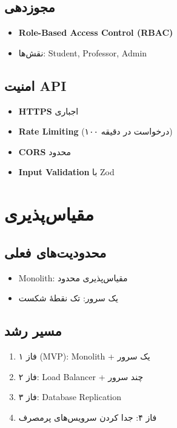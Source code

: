 \documentclass[12pt, a4paper]{article}
\begin{document}
\subsection{مجوزدهی}
\begin{itemize}
    \item \textbf{Role-Based Access Control (RBAC)}
    \item نقش‌ها: Student, Professor, Admin
\end{itemize}

\subsection{امنیت API}
\begin{itemize}
    \item \textbf{HTTPS} اجباری
    \item \textbf{Rate Limiting} (۱۰۰ درخواست در دقیقه)
    \item \textbf{CORS} محدود
    \item \textbf{Input Validation} با Zod
\end{itemize}

\section{مقیاس‌پذیری}

\subsection{محدودیت‌های فعلی}
\begin{itemize}
    \item Monolith: مقیاس‌پذیری محدود
    \item یک سرور: تک نقطهٔ شکست
\end{itemize}

\subsection{مسیر رشد}
\begin{enumerate}
    \item فاز ۱ (MVP): Monolith + یک سرور
    \item فاز ۲: Load Balancer + چند سرور
    \item فاز ۳: Database Replication
    \item فاز ۴: جدا کردن سرویس‌های پرمصرف
\end{enumerate}
\end{document}
